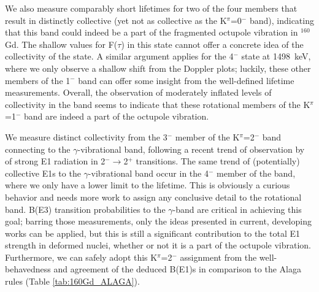  We also measure comparably short lifetimes for two of the four members that result in distinctly collective (yet not as collective as the K$^\pi$=0$^-$ band), indicating that this band could indeed be a part of the fragmented octupole vibration in $^{160}$Gd. The shallow values for F($\tau$) in this state cannot offer a concrete idea of the collectivity of the state. A similar argument applies for the 4$^-$ state at 1498~keV, where we only observe a shallow shift from the Doppler plots; luckily, these other members of the 1$^-$ band can offer some insight from the well-defined lifetime measurements. Overall, the observation of moderately inflated levels of collectivity in the band seems to indicate that these rotational members of the K$^\pi$=1$^-$ band are indeed a part of the octupole vibration.




 We measure distinct collectivity from the 3$^-$ member of the K$^\pi$=2$^-$ band connecting to the $\gamma$-vibrational band, following a recent trend of observation by \cite{Pascu_octupole_2015,Spiecker_E1strength} of strong E1 radiation in 2$^-\rightarrow$2$^+$ transitions. The same trend of (potentially) collective E1s to the $\gamma$-vibrational band occur in the 4$^-$ member of the band, where we only have a lower limit to the lifetime. This is obviously a curious behavior and needs more work to assign any conclusive detail to the rotational band. B(E3) transition probabilities to the $\gamma$-band are critical in achieving this goal; barring those measurements, only the ideas presented in current, developing works can be applied, but this is still a significant contribution to the total E1 strength in deformed nuclei, whether or not it is a part of the octupole vibration. Furthermore, we can safely adopt this K$^\pi$=2$^-$ assignment from the well-behavedness and agreement of the deduced B(E1)s in comparison to the Alaga rules (Table \ref{tab:160Gd_ALAGA}).


